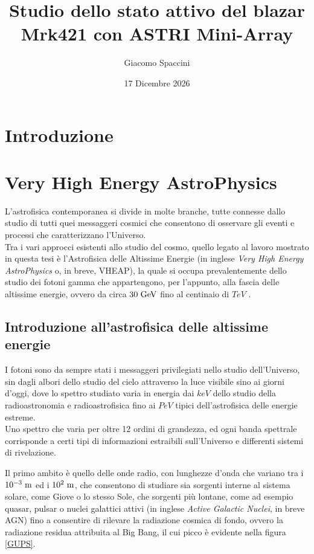 \documentclass[10pt]{article}
\title{Studio dello stato attivo del blazar Mrk421 con ASTRI Mini-Array​}
\author{Giacomo Spaccini}
\date{17 Dicembre 2026}
\begin{document}
\maketitle

\section{Introduzione}

\newpage

\section{Very High Energy AstroPhysics}

L'astrofisica contemporanea si divide in molte branche, tutte connesse dallo studio di tutti quei messaggeri cosmici che consentono di osservare gli eventi e processi che caratterizzano l'Universo.
\\
Tra i vari approcci esistenti allo studio del cosmo, quello legato al lavoro mostrato in questa tesi è l'Astrofisica delle Altissime Energie (in inglese \textit{Very High Energy AstroPhysics} o, in breve, VHEAP), la quale si occupa prevalentemente dello studio dei fotoni gamma che appartengono, per l'appunto, alla fascia delle altissime energie, ovvero da circa $ 30 \hspace{3 pt} \unit{GeV}$ fino al centinaio di $ \unit{TeV} $ \cite{GRA2018}.
\\

\subsection{Introduzione all'astrofisica delle altissime energie}

I fotoni sono da sempre stati i messaggeri privilegiati nello studio dell'Universo, sin dagli albori dello studio del cielo attraverso la luce visibile sino ai giorni d'oggi, dove lo spettro studiato varia in energia dai $\unit{keV}$ dello studio della radioastronomia e radioastrofisica fino ai $\unit{PeV}$ tipici dell'astrofisica delle energie estreme.
\\
Uno spettro che varia per oltre 12 ordini di grandezza, ed ogni banda spettrale corrisponde a certi tipi di informazioni estraibili sull'Universo e differenti sistemi di rivelazione.

Il primo ambito è quello delle onde radio, con lunghezze d'onda che variano tra i $ 10^{-3} \hspace{3 pt} \unit{m} $ ed i $ 10^2 \hspace{3 pt} \unit{m} $, che consentono di studiare sia sorgenti interne al sistema solare, come Giove o lo stesso Sole, che sorgenti più lontane, come ad esempio quasar, pulsar o nuclei galattici attivi (in inglese \textit{Active Galactic Nuclei}, in breve AGN) fino a consentire di rilevare la radiazione cosmica di fondo, ovvero la radiazione residua attribuita al Big Bang, il cui picco è evidente nella figura \ref{GUPS}.
\end{document}

